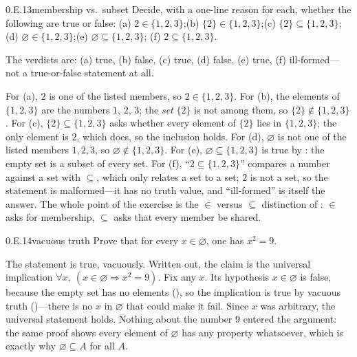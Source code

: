 \documentclass[main.tex]{subfiles}
\begin{document}
\begin{Exercise}{0.E.13}{membership vs.\ subset}
Decide, with a one-line reason for each, whether the following are true or false:
(a) $2\in\{1,2,3\}$;\quad (b) $\{2\}\in\{1,2,3\}$;\quad (c) $\{2\}\subseteq\{1,2,3\}$;\quad
(d) $\varnothing\in\{1,2,3\}$;\quad (e) $\varnothing\subseteq\{1,2,3\}$;\quad
(f) $2\subseteq\{1,2,3\}$.
\end{Exercise}
\begin{Solution}
The verdicts are: (a) true, (b) false, (c) true, (d) false, (e) true, (f) ill-formed---not a
true-or-false statement at all.

For (a), $2$ is one of the listed members, so $2\in\{1,2,3\}$. For (b), the elements of $\{1,2,3\}$
are the numbers $1$, $2$, $3$; the \emph{set} $\{2\}$ is not among them, so $\{2\}\notin\{1,2,3\}$.
For (c), $\{2\}\subseteq\{1,2,3\}$ asks whether every element of $\{2\}$ lies in $\{1,2,3\}$; the only
element is $2$, which does, so the inclusion holds. For (d), $\varnothing$ is not one of the listed
members $1,2,3$, so $\varnothing\notin\{1,2,3\}$. For (e), $\varnothing\subseteq\{1,2,3\}$ is true by
: the empty set is a subset of every set. For (f), ``$2\subseteq\{1,2,3\}$'' compares a
number against a set with $\subseteq$, which only relates a set to a set; $2$ is not a set, so the
statement is malformed---it has no truth value, and ``ill-formed'' is itself the answer. The whole
point of the exercise is the
$\in$ versus $\subseteq$ distinction of : $\in$ asks for membership, $\subseteq$ asks
that every member be shared.
\end{Solution}

\begin{Exercise}{0.E.14}{vacuous truth}
Prove that for every $x\in\varnothing$, one has $x^{2}=9$.
\end{Exercise}
\begin{Solution}
The statement is true, vacuously. Written out, the claim is the universal implication
$\forall x,\ (x\in\varnothing\Rightarrow x^{2}=9)$. Fix any $x$. Its hypothesis $x\in\varnothing$ is
false, because the empty set has no elements (), so the implication is true by vacuous
truth ()---there is no $x$ in $\varnothing$ that could make it fail. Since $x$ was
arbitrary, the universal statement holds. Nothing about the number $9$ entered the argument: the same
proof shows every element of $\varnothing$ has any property whatsoever, which is exactly why
$\varnothing\subseteq A$ for all $A$.
\end{Solution}
\end{document}
